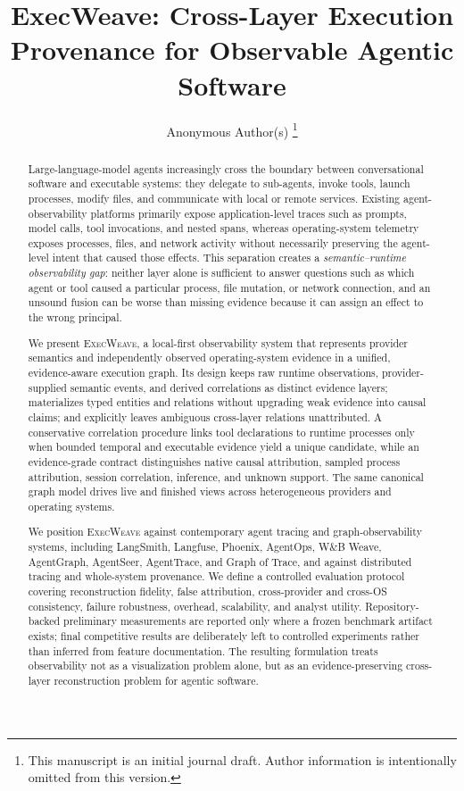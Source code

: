\documentclass[journal]{IEEEtran}
\title{ExecWeave: Cross-Layer Execution Provenance for Observable Agentic Software}
\author{Anonymous Author(s)%
\thanks{This manuscript is an initial journal draft. Author information is intentionally omitted from this version.}}
\newcommand{\system}{\textsc{ExecWeave}\xspace}
\begin{document}
\maketitle

\begin{abstract}
Large-language-model agents increasingly cross the boundary between conversational software and executable systems: they delegate to sub-agents, invoke tools, launch processes, modify files, and communicate with local or remote services. Existing agent-observability platforms primarily expose application-level traces such as prompts, model calls, tool invocations, and nested spans, whereas operating-system telemetry exposes processes, files, and network activity without necessarily preserving the agent-level intent that caused those effects. This separation creates a \emph{semantic--runtime observability gap}: neither layer alone is sufficient to answer questions such as which agent or tool caused a particular process, file mutation, or network connection, and an unsound fusion can be worse than missing evidence because it can assign an effect to the wrong principal.

We present \system, a local-first observability system that represents provider semantics and independently observed operating-system evidence in a unified, evidence-aware execution graph. Its design keeps raw runtime observations, provider-supplied semantic events, and derived correlations as distinct evidence layers; materializes typed entities and relations without upgrading weak evidence into causal claims; and explicitly leaves ambiguous cross-layer relations unattributed. A conservative correlation procedure links tool declarations to runtime processes only when bounded temporal and executable evidence yield a unique candidate, while an evidence-grade contract distinguishes native causal attribution, sampled process attribution, session correlation, inference, and unknown support. The same canonical graph model drives live and finished views across heterogeneous providers and operating systems.

We position \system against contemporary agent tracing and graph-observability systems, including LangSmith, Langfuse, Phoenix, AgentOps, W\&B Weave, AgentGraph, AgentSeer, AgentTrace, and Graph of Trace, and against distributed tracing and whole-system provenance. We define a controlled evaluation protocol covering reconstruction fidelity, false attribution, cross-provider and cross-OS consistency, failure robustness, overhead, scalability, and analyst utility. Repository-backed preliminary measurements are reported only where a frozen benchmark artifact exists; final competitive results are deliberately left to controlled experiments rather than inferred from feature documentation. The resulting formulation treats observability not as a visualization problem alone, but as an evidence-preserving cross-layer reconstruction problem for agentic software.
\end{abstract}
\end{document}
